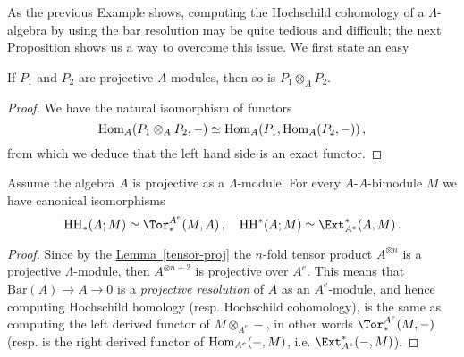 	As the previous Example shows,
	computing the Hochschild cohomology of a $\Lambda$-algebra 
	by using the bar resolution may be quite tedious and difficult; 
	the next Proposition shows us a way to overcome this issue.
	We first state an easy 
	
	\begin{lemma}\label{tensor-proj}
		If $P_{1}$ and $P_{2}$ are projective $A$-modules, then so is $P_{1} \otimes_{A} P_{2}$.
		\begin{proof}
			We have the natural isomorphism of functors
			\begin{equation*}
				\operatorname{Hom}_{A}(P_{1} \otimes_{A} P_{2},-) \simeq 
				\operatorname{Hom}_{A}(P_{1},\operatorname{Hom}_{A}(P_{2},-))\,,
			\end{equation*}
			from which we deduce that the left hand side is an exact functor.
		\end{proof}				
	\end{lemma}	
	
	\begin{prop}
		Assume the algebra $A$ is projective as a $\Lambda$-module.
		For every $A$-$A$-bimodule $M$ we have canonical isomorphisms
		\begin{equation*}
			\mathrm{HH}_{*}(A;M) \simeq \Tor_{*}^{A^{e}}(M,A)\,, \quad
			\mathrm{HH}^{*}(A;M) \simeq \Ext^{*}_{A^{e}}(A,M)\,.
		\end{equation*}
		\begin{proof}
			Since by the \hyperref[tensor-proj]{Lemma~\ref{tensor-proj}} the
			$n$-fold tensor product $A^{\otimes n}$ is a projective $\Lambda$-module,
			then $A^{\otimes n+2}$ is projective over $A^{e}$.
			This means that $\mathrm{Bar}(A) \to A \to 0$ is a 
			\emph{projective resolution} of $A$ as an $A^{e}$-module,
			and hence computing Hochschild homology
			(resp. Hochschild cohomology),
			is the same as computing the left derived functor of $M \otimes_{A^{e}} -$,
			in other words $\Tor^{A^{e}}_{*}(M,-)$
			(resp. is the right derived functor of $\operatorname{Hom}_{A^{e}}(-,M)$, 
			i.e. $\Ext^{*}_{A^{e}}(-,M)$).
		\end{proof}
	\end{prop}
	
